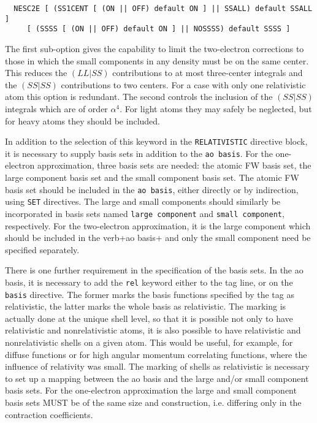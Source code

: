\begin{verbatim}
  NESC2E [ (SS1CENT [ (ON || OFF) default ON ] || SSALL) default SSALL ]
	 [ (SSSS [ (ON || OFF) default ON ] || NOSSSS) default SSSS ]

\end{verbatim}

The first sub-option gives the capability to limit the two-electron
corrections to those in which the small components in any density must be on
the same center.  This reduces the $(LL|SS)$ contributions to at most
three-center integrals and the $(SS|SS)$ contributions to two centers. For a
case with only one relativistic atom this option is redundant. The second
controls the inclusion of the $(SS|SS)$ integrals which are of order
$\alpha^4$. For light atoms they may safely be neglected, but for heavy
atoms they should be included. 

In addition to the selection of this keyword in the \verb+RELATIVISTIC+
directive block, it is necessary to supply basis sets in addition to the
\verb+ao basis+. For the one-electron approximation, three basis sets are
needed: the atomic FW basis set, the large component basis set and the small
component basis set. The atomic FW basis set should be included in the
\verb+ao basis+, either directly or by indirection, using \verb+SET+
directives.  The large and small components should similarly be incorporated
in basis sets named \verb+large component+ and \verb+small component+,
respectively. For the two-electron approximation, it is the large component
which should be included in the verb+ao basis+ and only the small component
need be specified separately.

There is one further requirement in the specification of the basis sets. In
the ao basis, it is necessary to add the \verb+rel+ keyword either to the
tag line, or on the \verb+basis+ directive. The former marks the basis
functions specified by the tag as relativistic, the latter marks the whole
basis as relativistic. The marking is actually done at the unique shell
level, so that it is possible not only to have relativistic and
nonrelativistic atoms, it is also possible to have relativistic and
nonrelativistic shells on a given atom. This would be useful, for example,
for diffuse functions or for high angular momentum correlating functions,
where the influence of relativity was small. The marking of shells as
relativistic is necessary to set up a mapping between the ao basis and the
large and/or small component basis sets. For the one-electron approximation
the large and small component basis sets MUST be of the same size and
construction, i.e. differing only in the contraction coefficients.

